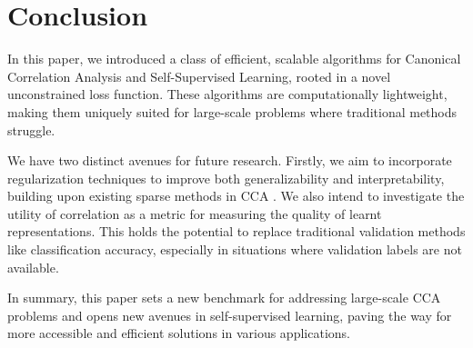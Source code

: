 %      
%          

\section{Conclusion}

In this paper, we introduced a class of efficient, scalable algorithms for Canonical Correlation Analysis and Self-Supervised Learning, rooted in a novel unconstrained loss function. These algorithms are computationally lightweight, making them uniquely suited for large-scale problems where traditional methods struggle.

We have two distinct avenues for future research. Firstly, we aim to incorporate regularization techniques to improve both generalizability and interpretability, building upon existing sparse methods in CCA \citep{witten2009extensions}. We also intend to investigate the utility of correlation as a metric for measuring the quality of learnt representations. This holds the potential to replace traditional validation methods like classification accuracy, especially in situations where validation labels are not available.

In summary, this paper sets a new benchmark for addressing large-scale CCA problems and opens new avenues in self-supervised learning, paving the way for more accessible and efficient solutions in various applications.